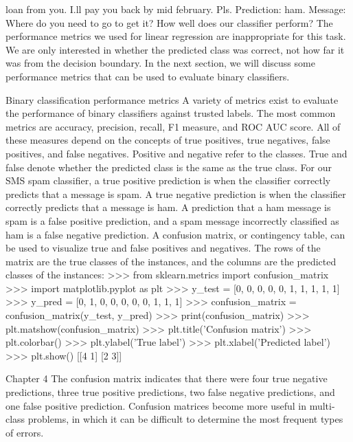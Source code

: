 \begin{frame}
\begin{frame}
\begin{frame}
loan from you. I.ll pay you back by mid february. Pls.
Prediction: ham. Message: Where do you need to go to get it?
How well does our classifier perform? The performance metrics we used for linear
regression are inappropriate for this task. We are only interested in whether the
predicted class was correct, not how far it was from the decision boundary. In the
next section, we will discuss some performance metrics that can be used to evaluate
binary classifiers.
\end{frame}
\begin{frame}
Binary classification performance metrics
A variety of metrics exist to evaluate the performance of binary classifiers against
trusted labels. The most common metrics are accuracy, precision, recall, F1 measure,
and ROC AUC score. All of these measures depend on the concepts of true positives,
true negatives, false positives, and false negatives. Positive and negative refer to the
classes. True and false denote whether the predicted class is the same as the true class.
For our SMS spam classifier, a true positive prediction is when the classifier correctly
predicts that a message is spam. A true negative prediction is when the classifier
correctly predicts that a message is ham. A prediction that a ham message is spam
is a false positive prediction, and a spam message incorrectly classified as ham is a
false negative prediction. 
A confusion matrix, or contingency table, can be used to
visualize true and false positives and negatives. The rows of the matrix are the true
classes of the instances, and the columns are the predicted classes of the instances:
>>> from sklearn.metrics import confusion_matrix
>>> import matplotlib.pyplot as plt
>>> y_test = [0, 0, 0, 0, 0, 1, 1, 1, 1, 1]
>>> y_pred = [0, 1, 0, 0, 0, 0, 0, 1, 1, 1]
>>> confusion_matrix = confusion_matrix(y_test, y_pred)
>>> print(confusion_matrix)
>>> plt.matshow(confusion_matrix)
>>> plt.title('Confusion matrix')
>>> plt.colorbar()
>>> plt.ylabel('True label')
>>> plt.xlabel('Predicted label')
>>> plt.show()
[[4 1]
[2 3]]
\begin{frame}
Chapter 4
The confusion matrix indicates that there were four true negative predictions, three
true positive predictions, two false negative predictions, and one false positive
prediction. Confusion matrices become more useful in multi-class problems, in
which it can be difficult to determine the most frequent types of errors.

\end{frame}
\end{frame}
\end{frame}
\end{frame}
